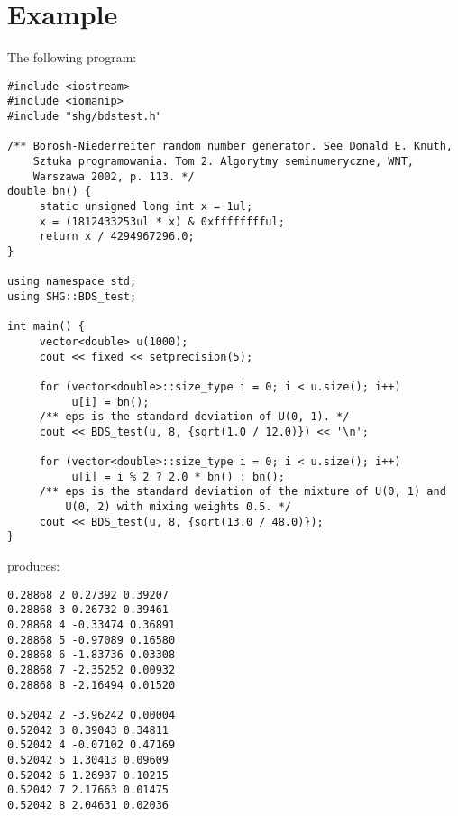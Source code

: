\section{Example}

The following program:

{\footnotesize \begin{verbatim}
#include <iostream>
#include <iomanip>
#include "shg/bdstest.h"

/** Borosh-Niederreiter random number generator. See Donald E. Knuth,
    Sztuka programowania. Tom 2. Algorytmy seminumeryczne, WNT,
    Warszawa 2002, p. 113. */
double bn() {
     static unsigned long int x = 1ul;
     x = (1812433253ul * x) & 0xfffffffful;
     return x / 4294967296.0;
}

using namespace std;
using SHG::BDS_test;

int main() {
     vector<double> u(1000);
     cout << fixed << setprecision(5);

     for (vector<double>::size_type i = 0; i < u.size(); i++)
          u[i] = bn();
     /** eps is the standard deviation of U(0, 1). */
     cout << BDS_test(u, 8, {sqrt(1.0 / 12.0)}) << '\n';

     for (vector<double>::size_type i = 0; i < u.size(); i++)
          u[i] = i % 2 ? 2.0 * bn() : bn();
     /** eps is the standard deviation of the mixture of U(0, 1) and
         U(0, 2) with mixing weights 0.5. */
     cout << BDS_test(u, 8, {sqrt(13.0 / 48.0)});
}
\end{verbatim}}
\noindent produces:
{\footnotesize \begin{verbatim}
0.28868 2 0.27392 0.39207
0.28868 3 0.26732 0.39461
0.28868 4 -0.33474 0.36891
0.28868 5 -0.97089 0.16580
0.28868 6 -1.83736 0.03308
0.28868 7 -2.35252 0.00932
0.28868 8 -2.16494 0.01520

0.52042 2 -3.96242 0.00004
0.52042 3 0.39043 0.34811
0.52042 4 -0.07102 0.47169
0.52042 5 1.30413 0.09609
0.52042 6 1.26937 0.10215
0.52042 7 2.17663 0.01475
0.52042 8 2.04631 0.02036
\end{verbatim}}
